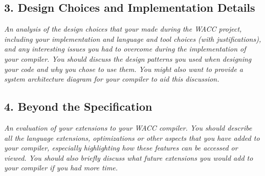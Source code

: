 \documentclass[10pt,a4paper]{report}
\begin{document}
  \subsection*{3. Design Choices and Implementation Details}
  \textit{An analysis of the design choices that your made during the WACC
  project, including your implementation and language and tool choices (with
  justifications), and any interesting issues you had to overcome during the
  implementation of your compiler. You should discuss the design patterns you
  used when designing your code and why you chose to use them. You might also
  want to provide a system architecture diagram for your compiler to aid this
  discussion.}

  \subsection*{4. Beyond the Specification}
  \textit{An evaluation of your extensions to your WACC compiler. You should
  describe all the language extensions, optimizations or other aspects that you
  have added to your compiler, especially highlighting how these features can be
  accessed or viewed. You should also briefly discuss what future extensions you
  would add to your compiler if you had more time.}
\end{document}
